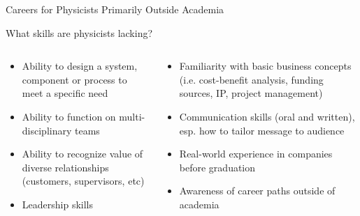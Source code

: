 \documentclass[xcolor={dvipsnames},professionalfonts]{beamer}
\begin{document}
\begin{frame}{Careers for Physicists Primarily Outside Academia}
 \begin{block}{What skills are physicists lacking?\footnotemark}
  \begin{columns}[T]
   \begin{column}{0.5\textwidth}
    \begin{itemize}
     \item Ability to design a system, component or process to meet a specific need
     \item Ability to function on multi-disciplinary teams
     \item Ability to recognize value of diverse relationships (customers, supervisors, etc)
     \item Leadership skills
    \end{itemize}
   \end{column}
   \begin{column}{0.5\textwidth}
    \begin{itemize}
     \item Familiarity with basic business concepts (i.e. cost-benefit analysis, funding sources, IP, project management)
     \item Communication skills (oral and written), esp. how to tailor message to audience
     \item Real-world experience in companies before graduation
     \item Awareness of career paths outside of academia
    \end{itemize}
   \end{column}
  \end{columns}
 \end{block}
\end{frame}
\end{document}
